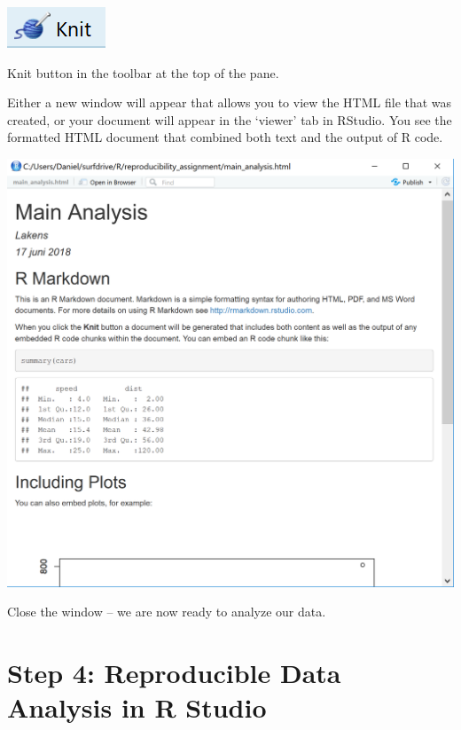 \documentclass[
  oneside]{krantz}
\begin{document}
\begin{center}\includegraphics[width=0.2\linewidth]{images/270645a5be86fa1d9d534f78b8ca0724} \end{center}

Knit button in the toolbar at the top of the pane.

Either a new window will appear that allows you to view the HTML file that was
created, or your document will appear in the `viewer' tab in RStudio. You see
the formatted HTML document that combined both text and the output of R code.

\begin{center}\includegraphics[width=1\linewidth]{images/9405a78d629bc5abd36ba8b31c42cfd9} \end{center}

Close the window -- we are now ready to analyze our data.

\hypertarget{step-4-reproducible-data-analysis-in-r-studio}{%
\section{Step 4: Reproducible Data Analysis in R Studio}\label{step-4-reproducible-data-analysis-in-r-studio}}
\end{document}
